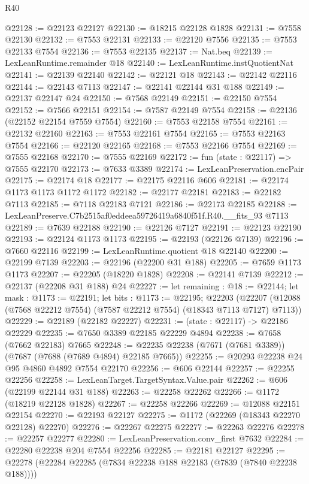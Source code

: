 \begin{lexlean}{R40}
\begin{coremodule}
@22128 := @22123 @22127
@22130 := @18215 @22128 @1828
@22131 := @7558 @22130
@22132 := @7553 @22131
@22133 := @22120 @7556
@22135 := @7553 @22133 @7554
@22136 := @7553 @22135
@22137 := Nat.beq
@22139 := LexLeanRuntime.remainder @18
@22140 := LexLeanRuntime.instQuotientNat
@22141 := @22139 @22140
@22142 := @22121 @18
@22143 := @22142 @22116
@22144 := @22143 @7113
@22147 := @22141 @22144 @31 @188
@22149 := @22137 @22147 @24
@22150 := @7568 @22149
@22151 := @22150 @7554
@22152 := @7566 @22151
@22154 := @7587 @22149 @7554
@22158 := @22136 (@22152 @22154 @7559 @7554)
@22160 := @7553 @22158 @7554
@22161 := @22132 @22160
@22163 := @7553 @22161 @7554
@22165 := @7553 @22163 @7554
@22166 := @22120 @22165
@22168 := @7553 @22166 @7554
@22169 := @7555 @22168
@22170 := @7555 @22169
@22172 := fun (state : @22117) => @7555 @22170
@22173 := @7633 @3389
@22174 := LexLeanPreservation.encPair
@22175 := @22174 @18
@22177 := @22175 @22116 @606
@22181 := @22174 @1173 @1173 @1172 @1172
@22182 := @22177 @22181
@22183 := @22182 @7113
@22185 := @7118 @22183 @7121
@22186 := @22173 @22185
@22188 := LexLeanPreserve.C7b2515af0eddeea59726419a6840f51f.R40.__fits_93 @7113
@22189 := @7639 @22188
@22190 := @22126 @7127
@22191 := @22123 @22190
@22193 := @22124 @1173 @1173
@22195 := @22193 (@22126 @7139)
@22196 := @7660 @22116
@22199 := LexLeanRuntime.quotient @18 @22140
@22200 := @22199 @7139
@22203 := @22196 (@22200 @31 @188)
@22205 := @7659 @1173 @1173
@22207 := @22205 (@18220 @1828)
@22208 := @22141 @7139
@22212 := @22137 (@22208 @31 @188) @24
@22227 := let remaining : @18 := @22144;
  let mask : @1173 := @22191;
  let bits : @1173 := @22195;
  @22203 (@22207 (@12088 (@7568 @22212 @7554) (@7587 @22212 @7554) (@18343 @7113 @7127) @7113))
@22229 := @22189 (@22182 @22227)
@22231 := (state : @22117) -> @22186 @22229
@22235 := @7650 @3389 @22185 @22229 @4894
@22238 := @7658 (@7662 @22183) @7665
@22248 := @22235 @22238 (@7671 (@7681 @3389)) (@7687 (@7688 (@7689 @4894) @22185 @7665))
@22255 := @20293 @22238 @24 @95 @4860 @4892 @7554 @22170
@22256 := @606 @22144
@22257 := @22255 @22256
@22258 := LexLeanTarget.TargetSyntax.Value.pair
@22262 := @606 (@22199 @22144 @31 @188)
@22263 := @22258 @22262
@22266 := @1172 (@18219 @22128 @1828)
@22267 := @22258 @22266
@22269 := @12088 @22151 @22154
@22270 := @22193 @22127
@22275 := @1172 (@22269 (@18343 @22270 @22128) @22270)
@22276 := @22267 @22275
@22277 := @22263 @22276
@22278 := @22257 @22277
@22280 := LexLeanPreservation.conv_first @7632
@22284 := @22280 @22238 @204 @7554 @22256
@22285 := @22181 @22127
@22295 := @22278 (@22284 @22285 (@7834 @22238 @188 @22183 (@7839 (@7840 @22238 @188))))

\end{coremodule}
\end{lexlean}
